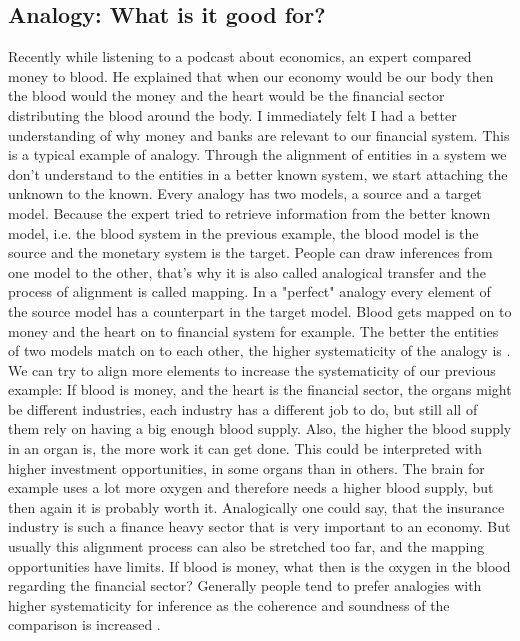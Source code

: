 \documentclass[a4paper,man,natbib,floatsintext,import]{apa6}
\begin{document}
\subsection{Analogy: What is it good for?}
Recently while listening to a podcast about economics, an expert compared money to blood. He explained that when our economy would be our body then the blood would the money and the heart would be the financial sector distributing the blood around the body. I immediately felt I had a better understanding of why money and banks are relevant to our financial system.
This is a typical example of analogy. Through the alignment of entities in a system we don't understand to the entities in a better known system, we start attaching the unknown to the known. Every analogy has two models, a source and a target model. Because the expert tried to retrieve information from the better known model, i.e. the blood system in the previous example, the blood model is the source and the monetary system is the target. People can draw inferences from one model to the other, that's why it is also called analogical transfer and the process of alignment is called mapping. In a "perfect" analogy every element of the source model has a counterpart in the target model. Blood gets mapped on to money and the heart on to financial system for example. The better the entities of two models match on to each other, the higher systematicity of the analogy is \citep{Gentner1997}. We can try to align more elements to increase the systematicity of our previous example: If blood is money, and the heart is the financial sector, the organs might be different industries, each industry has a different job to do, but still all of them rely on having a big enough blood supply. Also, the higher the blood supply in an organ is, the more work it can get done. This could be interpreted with higher investment opportunities, in some organs than in others. The brain for example uses a lot more oxygen and therefore needs a higher blood supply, but then again it is probably worth it. Analogically one could say, that the insurance industry is such a finance heavy sector that is very important to an economy. But usually this alignment process can also be stretched too far, and the mapping opportunities have limits. If blood is money, what then is the oxygen in the blood regarding the financial sector? Generally people tend to prefer analogies with higher systematicity for inference as the coherence and soundness of the comparison is increased \citep{Clement1991}.
\end{document}
